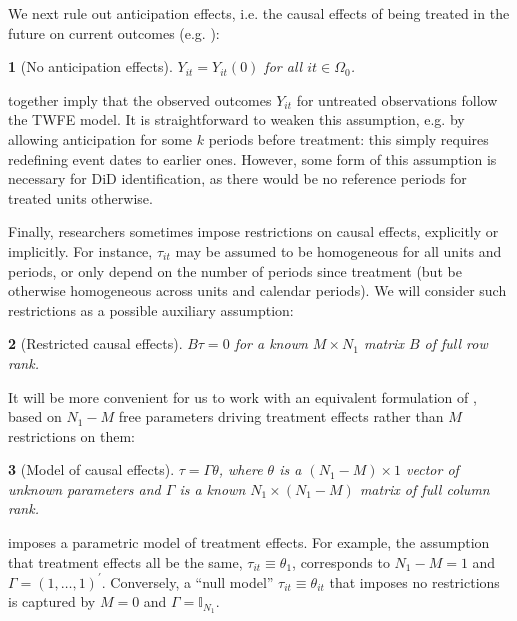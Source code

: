 \documentclass[english,11pt]{article}
\theoremstyle{plain}
\newtheorem{assumption}{\protect\assumptionname}
\theoremstyle{plain}
\theoremstyle{plain}
\theoremstyle{plain}
\let\ref\Cref
\providecommand{\assumptionname}{Assumption}
\begin{document}
We next rule out anticipation effects, i.e. the causal effects of
being treated in the future on current outcomes (e.g. \cite{Abbring2003}):
\begin{assumption}[No anticipation effects]
\label{assu:A2}$Y_{it}=Y_{it}(0)$ for all $it\in\Omega_{0}$.
\end{assumption}
\ref{assu:A1,assu:A2} together imply that the observed outcomes $Y_{it}$
for untreated observations follow the TWFE model. It is straightforward
to weaken this assumption, e.g. by allowing anticipation for some
$k$ periods before treatment: this simply requires redefining event
dates to earlier ones. However, some form of this assumption is necessary
for DiD identification, as there would be no reference periods for
treated units otherwise.

Finally, researchers sometimes impose restrictions on causal effects,
explicitly or implicitly. For instance, $\tau_{it}$ may be assumed
to be homogeneous for all units and periods, or only depend on the
number of periods since treatment (but be otherwise homogeneous across
units and calendar periods). We will consider such restrictions as
a possible auxiliary assumption:
\begin{assumption}[Restricted causal effects]
\label{assu:A3} $B\tau=0$ for a known $M\times N_{1}$ matrix $B$
of full row rank.
\end{assumption}
It will be more convenient for us to work with an equivalent formulation
of \ref{assu:A3}, based on $N_{1}-M$ free parameters driving treatment
effects rather than $M$ restrictions on them:\renewcommand{\theassumption}{3$^\prime$} 
\begin{assumption}[Model of causal effects]
\label{assu:A3prime}$\tau=\Gamma\theta$, where $\theta$ is a $\left(N_{1}-M\right)\times1$
vector of unknown parameters and $\Gamma$ is a known $N_{1}\times\left(N_{1}-M\right)$
matrix of full column rank.
\end{assumption}
\renewcommand{\theassumption}{\arabic{assumption}}\setcounter{assumption}{3} \ref{assu:A3prime}
imposes a parametric model of treatment effects. For example, the
assumption that treatment effects all be the same, $\tau_{it}\equiv\theta_{1}$,
corresponds to $N_{1}-M=1$ and $\Gamma=\left(1,\dots,1\right)^{\prime}$.
Conversely, a ``null model'' $\tau_{it}\equiv\theta_{it}$ that
imposes no restrictions is captured by $M=0$ and $\Gamma=\mathbb{I}_{N_{1}}$.
\end{document}

